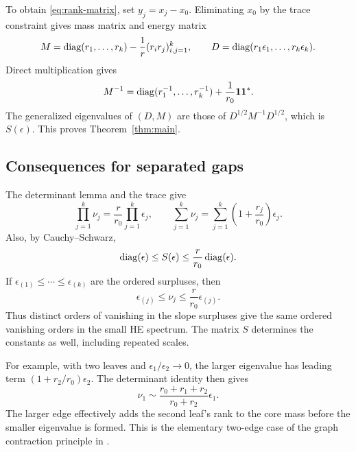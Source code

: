To obtain \eqref{eq:rank-matrix}, set $y_j=x_j-x_0$. Eliminating
$x_0$ by the trace constraint gives mass matrix and energy matrix
\[
 M=\operatorname{diag}(r_1,\ldots,r_k)-\frac1r(r_ir_j)_{i,j=1}^k,
 \qquad D=\operatorname{diag}(r_1\epsilon_1,\ldots,r_k\epsilon_k).
\]
Direct multiplication gives
\[
 M^{-1}=\operatorname{diag}(r_1^{-1},\ldots,r_k^{-1})+\frac1{r_0}\mathbf1\mathbf1^*.
\]
The generalized eigenvalues of $(D,M)$ are those of
$D^{1/2}M^{-1}D^{1/2}$, which is $S(\epsilon)$.
This proves Theorem~\ref{thm:main}.

\subsection{Consequences for separated gaps}
The determinant lemma and the trace give
\begin{equation}\label{eq:det-trace}
 \prod_{j=1}^k\nu_j=\frac r{r_0}\prod_{j=1}^k\epsilon_j,
 \qquad
 \sum_{j=1}^k\nu_j=\sum_{j=1}^k\left(1+\frac{r_j}{r_0}\right)\epsilon_j.
\end{equation}
Also, by Cauchy--Schwarz,
\[
 \operatorname{diag}(\epsilon)\le S(\epsilon)
       \le\frac r{r_0}\operatorname{diag}(\epsilon).
\]
If $\epsilon_{(1)}\le\cdots\le\epsilon_{(k)}$ are the ordered
surpluses, then
\begin{equation}\label{eq:gap-bounds}
 \epsilon_{(j)}\le\nu_j\le\frac r{r_0}\epsilon_{(j)}.
\end{equation}
Thus distinct orders of vanishing in the slope surpluses give the
same ordered vanishing orders in the small HE spectrum. The matrix
$S$ determines the constants as well, including repeated scales.

For example, with two leaves and $\epsilon_1/\epsilon_2\to0$,
the larger eigenvalue has leading term
$(1+r_2/r_0)\epsilon_2$. The determinant identity then gives
\[
 \nu_1\sim\frac{r_0+r_1+r_2}{r_0+r_2}\epsilon_1.
\]
The larger edge effectively adds the second leaf's rank to the core
mass before the smaller eigenvalue is formed. This is the elementary
two-edge case of the graph contraction principle in \cite{Flow}.
